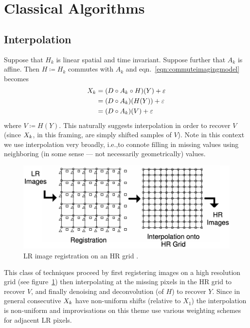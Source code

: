 \section{Classical Algorithms}\label{sec:classical-algorithms}
\localtableofcontents
\subsection{Interpolation}\label{subsec:interpolation}

Suppose that \(H_k\) is linear spatial and time invariant.
%
Suppose further that \(A_k\) is affine.
%
Then \(H \coloneqq H_k\) commutes with \(A_k\) \cite{meladcommute} and eqn.~\eqref{eqn:commuteimagingmodel} becomes
\begin{equation}
    \label{eqn:commuteimagingmodel}
    \begin{split}
        \Xk &= (D \circ A_k \circ H) (Y) + \varepsilon \\
        &= (D \circ A_k) (H(Y)) + \varepsilon \\
        &= (D \circ A_k) (V) + \varepsilon
    \end{split}
\end{equation}
%
where \(V \coloneqq H(Y)\).
%
This naturally suggests interpolation in order to recover \(V\) (since \(X_k\), in this framing, are simply shifted samples of \(V\)).
%
Note in this context we use interpolation very broadly, i.e.,to connote filling in missing values using neighboring (in some sense --- not necessarily geometrically) values.
%
\begin{figure}[!htbp]
    \centering
    \includegraphics[width=\linewidth,keepaspectratio]{figures/classical/hrgrid.png}
    \caption{LR image registration on an HR grid \cite{Lin}.}
    \label{fig:hrgrid}
\end{figure}
This class of techniques proceed by first registering images on a high resolution grid (see figure~\ref{fig:hrgrid}) then interpolating at the missing pixels in the HR grid to recover \(V\), and finally denoising and deconvolution (of \(H\)) to recover \(Y\).
%
Since in general consecutive \(X_k\) have non-uniform shifts (relative to \(X_1\)) the interpolation is non-uniform and improvisations on this theme use various weighting schemes for adjacent LR pixels.

